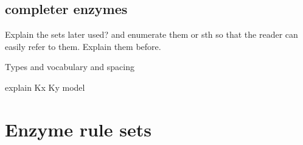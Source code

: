         \subsection{completer enzymes}

        \begin{itemize}
            {
                \color{red}
                \item Explain the sets later used? and enumerate them or sth so that the reader can easily refer to them. Explain them before.
                \item Types and vocabulary and spacing
                \item explain Kx Ky model
            }
        \end{itemize}
    \section{Enzyme rule sets}

%
%